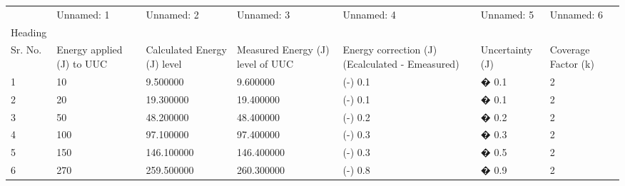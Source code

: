 \begin{tabular}{lllllll}
\toprule
 & Unnamed: 1 & Unnamed: 2 & Unnamed: 3 & Unnamed: 4 & Unnamed: 5 & Unnamed: 6 \\
Heading &  &  &  &  &  &  \\
\midrule
Sr. No. & Energy applied (J) to UUC & Calculated Energy (J) level & Measured Energy (J) level of UUC & Energy correction (J) (Ecalculated - Emeasured) & Uncertainty (J) & Coverage Factor (k) \\
1 & 10 & 9.500000 & 9.600000 & (-) 0.1 & � 0.1 & 2 \\
2 & 20 & 19.300000 & 19.400000 & (-) 0.1 & � 0.1 & 2 \\
3 & 50 & 48.200000 & 48.400000 & (-) 0.2 & � 0.2 & 2 \\
4 & 100 & 97.100000 & 97.400000 & (-) 0.3 & � 0.3 & 2 \\
5 & 150 & 146.100000 & 146.400000 & (-) 0.3 & � 0.5 & 2 \\
6 & 270 & 259.500000 & 260.300000 & (-) 0.8 & � 0.9 & 2 \\
\bottomrule
\end{tabular}

